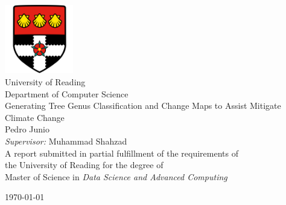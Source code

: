 \begin{titlepage}      
        \begin{center}
            \includegraphics[width=3cm]{figures/figures_misc/uorlogo.png}\\[0.5cm]
            {\LARGE University of Reading\\[0.5cm]
            Department of Computer Science}\\[2cm]
			
            \linespread{1.2}\huge {
                Generating Tree Genus Classification and Change Maps to Assist Mitigate Climate Change
            }
            \linespread{1}~\\[2cm]
            {\Large 
                Pedro Junio
            }\\[1cm] 
            

            {\large 
                \emph{Supervisor:} Muhammad Shahzad}\\[1cm] %
            
            \large A report submitted in partial fulfillment of the requirements of\\the University of Reading for the degree of\\ Master of Science in \textit{Data Science and Advanced Computing}\\[0.3cm] 
            \vfill
            
            \today 
        \end{center}
    \end{titlepage}
